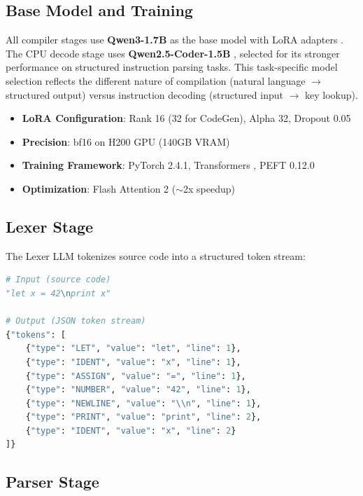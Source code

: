 \documentclass[11pt,a4paper]{article}
\begin{document}
\subsection{Base Model and Training}

All compiler stages use \textbf{Qwen3-1.7B} \citep{qwen3_2025} as the base model with LoRA adapters \citep{hu2022lora}. The CPU decode stage uses \textbf{Qwen2.5-Coder-1.5B} \citep{qwen25coder_2024}, selected for its stronger performance on structured instruction parsing tasks. This task-specific model selection reflects the different nature of compilation (natural language $\rightarrow$ structured output) versus instruction decoding (structured input $\rightarrow$ key lookup).

\begin{itemize}
    \item \textbf{LoRA Configuration}: Rank 16 (32 for CodeGen), Alpha 32, Dropout 0.05
    \item \textbf{Precision}: bf16 on H200 GPU (140GB VRAM)
    \item \textbf{Training Framework}: PyTorch 2.4.1, Transformers \citep{wolf2020transformers}, PEFT 0.12.0 \citep{peft2022}
    \item \textbf{Optimization}: Flash Attention 2 \citep{dao2023flashattention2} ($\sim$2x speedup)
\end{itemize}

\subsection{Lexer Stage}

The Lexer LLM tokenizes source code into a structured token stream:

\begin{lstlisting}[language=Python, caption=Lexer Input/Output Example]
# Input (source code)
"let x = 42\nprint x"

# Output (JSON token stream)
{"tokens": [
    {"type": "LET", "value": "let", "line": 1},
    {"type": "IDENT", "value": "x", "line": 1},
    {"type": "ASSIGN", "value": "=", "line": 1},
    {"type": "NUMBER", "value": "42", "line": 1},
    {"type": "NEWLINE", "value": "\\n", "line": 1},
    {"type": "PRINT", "value": "print", "line": 2},
    {"type": "IDENT", "value": "x", "line": 2}
]}
\end{lstlisting}

\subsection{Parser Stage}
\end{document}
